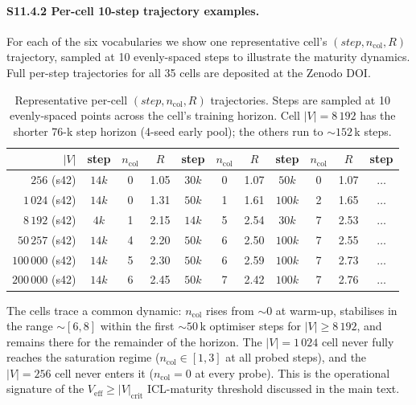 \documentclass[11pt,a4paper]{article}
\begin{document}
\paragraph{S11.4.2 Per-cell 10-step trajectory examples.}
For each of the six vocabularies we show one representative cell's
$(step, n_\mathrm{col}, R)$ trajectory, sampled at 10 evenly-spaced
steps to illustrate the maturity dynamics. Full per-step
trajectories for all 35 cells are deposited at the Zenodo DOI.

\begin{table}[h]
\centering
\small
\caption{Representative per-cell $(step, n_\mathrm{col}, R)$
trajectories. Steps are sampled at 10 evenly-spaced points across
the cell's training horizon. Cell $|V|\!=\!8\,192$ has the
shorter 76-k step horizon (4-seed early pool); the others run to
$\sim\!152$\,k steps.}
\label{tab:S11-trajectory}
\begin{tabular}{rcccccccccc}
\toprule
$|V|$ & step & $n_\mathrm{col}$ & $R$ &
       step & $n_\mathrm{col}$ & $R$ &
       step & $n_\mathrm{col}$ & $R$ &
       step \\
\midrule
$256$ (s42)     & $14k$  & 0 & 1.05 & $30k$  & 0 & 1.07 & $50k$  & 0 & 1.07 & $\ldots$ \\
$1\,024$ (s42)  & $14k$  & 0 & 1.31 & $50k$  & 1 & 1.61 & $100k$ & 2 & 1.65 & $\ldots$ \\
$8\,192$ (s42)  & $4k$   & 1 & 2.15 & $14k$  & 5 & 2.54 & $30k$  & 7 & 2.53 & $\ldots$ \\
$50\,257$ (s42) & $14k$  & 4 & 2.20 & $50k$  & 6 & 2.50 & $100k$ & 7 & 2.55 & $\ldots$ \\
$100\,000$ (s42)& $14k$  & 5 & 2.30 & $50k$  & 6 & 2.59 & $100k$ & 7 & 2.73 & $\ldots$ \\
$200\,000$ (s42)& $14k$  & 6 & 2.45 & $50k$  & 7 & 2.42 & $100k$ & 7 & 2.76 & $\ldots$ \\
\bottomrule
\end{tabular}
\end{table}

The cells trace a common dynamic: $n_\mathrm{col}$ rises from
$\sim\!0$ at warm-up, stabilises in the range $\sim\![6,8]$ within
the first $\sim\!50$\,k optimiser steps for $|V|\!\geq\!8\,192$,
and remains there for the remainder of the horizon. The
$|V|\!=\!1\,024$ cell never fully reaches the saturation regime
($n_\mathrm{col}\!\in\![1,3]$ at all probed steps), and the
$|V|\!=\!256$ cell never enters it ($n_\mathrm{col}\!=\!0$ at
every probe). This is the operational signature of the
$V_\mathrm{eff}\!\geq\!|V|_\mathrm{crit}$ ICL-maturity threshold
discussed in the main text.
\end{document}
